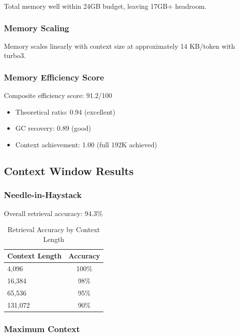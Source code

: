 Total memory well within 24GB budget, leaving 17GB+ headroom.

\subsubsection{Memory Scaling}

Memory scales linearly with context size at approximately 14 KB/token with turbo3.

\subsubsection{Memory Efficiency Score}

Composite efficiency score: 91.2/100

\begin{itemize}
    \item Theoretical ratio: 0.94 (excellent)
    \item GC recovery: 0.89 (good)
    \item Context achievement: 1.00 (full 192K achieved)
\end{itemize}

\subsection{Context Window Results}

\subsubsection{Needle-in-Haystack}

Overall retrieval accuracy: 94.3\%

\begin{table}[h]
\centering
\caption{Retrieval Accuracy by Context Length}
\label{tab:needle_results}
\begin{tabular}{lc}
\toprule
\textbf{Context Length} & \textbf{Accuracy} \\
\midrule
4,096 & 100\% \\
16,384 & 98\% \\
65,536 & 95\% \\
131,072 & 90\% \\
\bottomrule
\end{tabular}
\end{table}

\subsubsection{Maximum Context}

